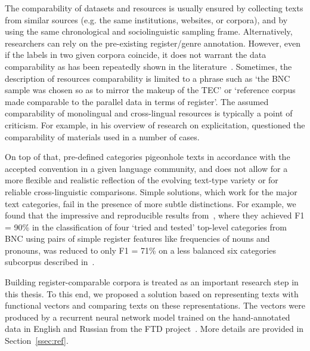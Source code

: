 The comparability of datasets and resources is usually ensured by collecting texts from similar sources (e.g. the same institutions, websites, or corpora), and by using the same chronological and sociolinguistic sampling frame. 
Alternatively, researchers can rely on the pre-existing register/genre annotation. However, even if the labels in two given corpora coincide, it does not warrant the data comparability as has been repeatedly shown in the literature~\cite{Sharoff2018, Delaere2015}. %
Sometimes, the description of resources comparability is limited to a phrase such as `the BNC sample was chosen so as to mirror the makeup of the TEC' or `reference corpus made comparable to the parallel data in terms of register'. The assumed comparability of monolingual and cross-lingual resources is typically a point of criticism. For example, in his overview of research on explicitation, \citet{Becher2011} questioned the comparability of materials used in a number of cases. 

On top of that, pre-defined categories pigeonhole texts in accordance with the accepted convention in a given language community, and does not allow for a more flexible and realistic reflection of the evolving text-type variety or for reliable cross-linguistic comparisons. Simple solutions, which work for the major text categories, fail in the presence of more subtle distinctions. For example, we found that the impressive and reproducible results from~\citet{Lijffijt2017}, where they achieved F1 = 90\% in the classification of four `tried and tested' top-level categories from \gls{BNC} using pairs of simple register features like frequencies of nouns and pronouns, was reduced to only F1 = 71\% on a less balanced six categories subcorpus described in~\citet{Kunilovskaya2019similar}.

Building register-comparable corpora is treated as an important research step in this thesis. To this end, we proposed a solution based on representing texts with functional vectors and comparing texts on these representations. The vectors were produced by a recurrent neural network model trained on the hand-annotated data in English and Russian from the \gls{FTD} project~\cite{Sharoff2018}. More details are provided in Section~\ref{ssec:ref}.

